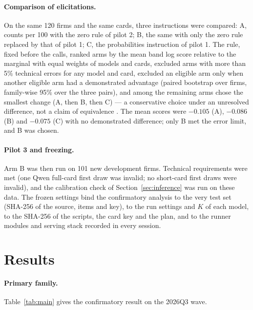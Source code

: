 \documentclass[11pt]{article}
\begin{document}
\paragraph{Comparison of elicitations.} On the same 120 firms and the same cards, three instructions were compared:
A, counts per 100 with the zero rule of pilot 2; B, the same with only the zero rule replaced by that of pilot 1; C, the
probabilities instruction of pilot 1. The rule, fixed before the calls, ranked arms by the mean band log score relative
to the marginal with equal weights of models and cards, excluded arms with more than 5\% technical errors for any model
and card, excluded an eligible arm only when another eligible arm had a demonstrated advantage (paired bootstrap over
firms, family-wise 95\% over the three pairs), and among the remaining arms chose the smallest change (A, then B, then
C) --- a conservative choice under an unresolved difference, not a claim of equivalence \citep{lakens2017}. The mean
scores were $-0.105$ (A), $-0.086$ (B) and $-0.075$ (C) with no demonstrated difference; only B met the error limit,
and B was chosen.

\paragraph{Pilot 3 and freezing.} Arm B was then run on 101 new development firms. Technical requirements were met
(one Qwen full-card first draw was invalid; no short-card first draws were invalid), and the calibration check of
Section~\ref{sec:inference} was run on these data. The frozen settings bind the confirmatory analysis to the very test
set (SHA-256 of the source, items and key), to the run settings and $K$ of each model, to the SHA-256 of the scripts,
the card key and the plan, and to the runner modules and serving stack recorded in every session.

\section{Results}

\paragraph{Primary family.} Table~\ref{tab:main} gives the confirmatory result on the 2026Q3 wave.
\end{document}
